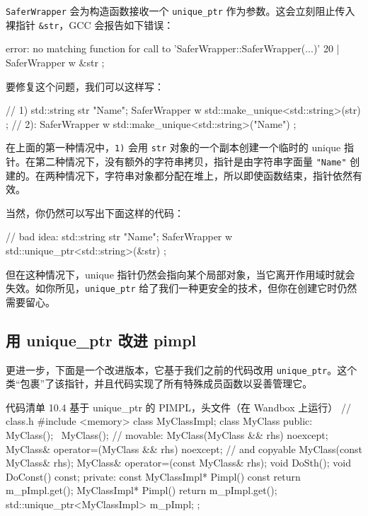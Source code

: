 \texttt{SaferWrapper} 会为构造函数接收一个 \texttt{unique\_ptr} 作为参数。这会立刻阻止传入裸指针 \texttt{\&str}，GCC 会报告如下错误：

\begin{codebox}[cpp]
error: no matching function for call to 'SaferWrapper::SaferWrapper(...)'
20 |
SaferWrapper w { &str };
\end{codebox}

要修复这个问题，我们可以这样写：

\begin{codebox}[cpp]
// 1)
std::string str { "Name"};
SaferWrapper w { std::make_unique<std::string>(str) };
// 2):
SaferWrapper w { std::make_unique<std::string>("Name") };
\end{codebox}

在上面的第一种情况中，\texttt{1)} 会用 \texttt{str} 对象的一个副本创建一个临时的 unique 指针。在第二种情况下，没有额外的字符串拷贝，指针是由字符串字面量 \texttt{"Name"} 创建的。在两种情况下，字符串对象都分配在堆上，所以即使函数结束，指针依然有效。

当然，你仍然可以写出下面这样的代码：

\begin{codebox}[cpp]
// bad idea:
std::string str { "Name"};
SaferWrapper w { std::unique_ptr<std::string>(&str) };
\end{codebox}

但在这种情况下，unique 指针仍然会指向某个局部对象，当它离开作用域时就会失效。如你所见，\texttt{unique\_ptr} 给了我们一种更安全的技术，但你在创建它时仍然需要留心。

\subsection{用 unique\_ptr 改进 pimpl}

更进一步，下面是一个改进版本，它基于我们之前的代码改用 \texttt{unique\_ptr}。这个类“包裹”了该指针，并且代码实现了所有特殊成员函数以妥善管理它。

\begin{codeboxt}[cpp]{代码清单 10.4 基于 unique\_ptr 的 PIMPL，头文件（在 Wandbox 上运行）}
// class.h
#include <memory>
class MyClassImpl;
class MyClass {
public:
MyClass();
~MyClass();
// movable:
MyClass(MyClass && rhs) noexcept;
MyClass& operator=(MyClass && rhs) noexcept;
// and copyable
MyClass(const MyClass& rhs);
MyClass& operator=(const MyClass& rhs);
void DoSth();
void DoConst() const;
private:
const MyClassImpl* Pimpl() const { return m_pImpl.get(); }
MyClassImpl* Pimpl() { return m_pImpl.get(); }
std::unique_ptr<MyClassImpl> m_pImpl;
};
\end{codeboxt}

